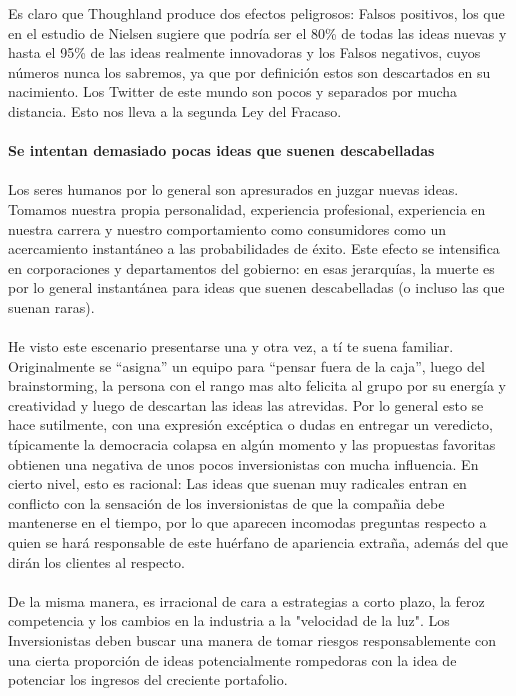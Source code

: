 \documentclass{article}
\begin{document}
Es claro que Thoughland produce dos efectos peligrosos: Falsos positivos, los que en el estudio de Nielsen sugiere que podr\'ia ser el 80\% de todas las ideas nuevas y hasta el 95\% de las ideas realmente innovadoras y los Falsos negativos, cuyos n\'umeros nunca los sabremos, ya que por definici\'on estos son descartados en su nacimiento.    Los Twitter de este mundo son pocos y separados por mucha distancia.    Esto nos lleva a la segunda Ley del Fracaso.
\\ \\
\textbf{Se intentan demasiado pocas ideas que suenen descabelladas}
\\ \\
Los seres humanos por lo general son apresurados en juzgar nuevas ideas. Tomamos nuestra propia personalidad, experiencia profesional, experiencia en nuestra carrera y nuestro comportamiento como consumidores como un acercamiento instant\'aneo a las probabilidades de \'exito. Este efecto se intensifica en corporaciones y departamentos del gobierno: en esas jerarqu\'ias, la muerte es por lo general instant\'anea para ideas que suenen descabelladas (o incluso las que suenan raras).
\\ \\
He visto este escenario presentarse una y otra vez, a t\'i te suena familiar. Originalmente se ``asigna'' un equipo para ``pensar fuera de la caja'', luego del brainstorming, la persona con el rango mas alto felicita al grupo por su energ\'ia y creatividad y luego de descartan las ideas las atrevidas. Por lo general esto se hace sutilmente, con una expresi\'on exc\'eptica o dudas en entregar un veredicto, t\'ipicamente la democracia colapsa en alg\'un momento y las propuestas favoritas obtienen una negativa de unos pocos inversionistas con mucha influencia. En cierto nivel, esto es racional: Las ideas que suenan muy radicales entran en conflicto con la sensaci\'on de los inversionistas de que la compa\~nia debe mantenerse en el tiempo, por lo que aparecen incomodas preguntas respecto a quien se har\'a responsable de este hu\'erfano de apariencia extra\~na, adem\'as del que dir\'an los clientes al respecto.
\\ \\
De la misma manera, es irracional de cara a estrategias a corto plazo, la feroz competencia y los cambios en la industria a la "velocidad de la luz". Los Inversionistas deben buscar una manera de tomar riesgos responsablemente con una cierta proporci\'on de ideas potencialmente rompedoras con la idea de potenciar los ingresos del creciente portafolio.
\end{document}
